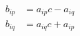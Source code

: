 \documentclass{article}
\begin{document}
\begin{align}
	b_{ip} &= a_{ip}c - a_{iq}\\
	b_{iq} &= a_{iq}c + a_{ip}\\
	
\end{align}
\end{document}
